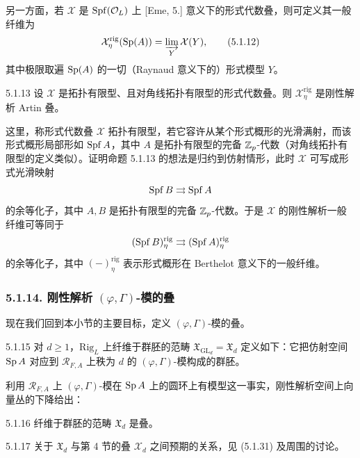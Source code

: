 另一方面，若 $\mathcal{X}$ 是 $\operatorname{Spf}(\mathcal{O}_L)$ 上 [Eme, 5.] 意义下的形式代数叠，则可定义其一般纤维为
\begin{equation}
\mathcal{X}^{\mathrm{rig}}_\eta(\operatorname{Sp}(A))=\varinjlim_{Y}\mathcal{X}(Y),\tag{5.1.12}
\end{equation}
其中极限取遍 $\operatorname{Sp}(A)$ 的一切（Raynaud 意义下的）形式模型 $Y$。

\begin{prop}{5.1.13}\label{prop:a4-5-1-13}
设 $\mathcal{X}$ 是拓扑有限型、且对角线拓扑有限型的形式代数叠。则 $\mathcal{X}^{\mathrm{rig}}_\eta$ 是刚性解析 Artin 叠。
\end{prop}

这里，称形式代数叠 $\mathcal{X}$ 拓扑有限型，若它容许从某个形式概形的光滑满射，而该形式概形局部形如 $\operatorname{Spf} A$，其中 $A$ 是拓扑有限型的完备 $\mathbb{Z}_p$-代数（对角线拓扑有限型的定义类似）。证明命题 5.1.13 的想法是归约到仿射情形，此时 $\mathcal{X}$ 可写成形式光滑映射
\[
\operatorname{Spf} B\rightrightarrows\operatorname{Spf} A
\]
的余等化子，其中 $A,B$ 是拓扑有限型的完备 $\mathbb{Z}_p$-代数。于是 $\mathcal{X}$ 的刚性解析一般纤维可等同于
\[
(\operatorname{Spf} B)^{\mathrm{rig}}_\eta\rightrightarrows(\operatorname{Spf} A)^{\mathrm{rig}}_\eta
\]
的余等化子，其中 $(-)^{\mathrm{rig}}_\eta$ 表示形式概形在 Berthelot 意义下的一般纤维。

\subsubsection*{5.1.14. 刚性解析 $(\varphi,\Gamma)$-模的叠}
现在我们回到本小节的主要目标，定义 $(\varphi,\Gamma)$-模的叠。

\begin{defn}{5.1.15}\label{defn:a4-5-1-15}
对 $d\ge1$，$\mathrm{Rig}_L$ 上纤维于群胚的范畴 $\mathfrak{X}_{\mathrm{GL}_d}=\mathfrak{X}_d$ 定义如下：它把仿射空间 $\operatorname{Sp} A$ 对应到 $\mathcal{R}_{F,A}$ 上秩为 $d$ 的 $(\varphi,\Gamma)$-模构成的群胚。
\end{defn}

利用 $\mathcal{R}_{F,A}$ 上 $(\varphi,\Gamma)$-模在 $\operatorname{Sp} A$ 上的圆环上有模型这一事实，刚性解析空间上向量丛的下降给出：

\begin{prop}{5.1.16}\label{prop:a4-5-1-16}
纤维于群胚的范畴 $\mathfrak{X}_d$ 是叠。
\end{prop}

\begin{rem}{5.1.17}\label{rem:a4-5-1-17}
关于 $\mathfrak{X}_d$ 与第 4 节的叠 $\mathcal{X}_d$ 之间预期的关系，见 (5.1.31) 及周围的讨论。
\end{rem}

